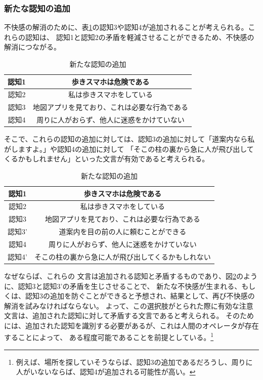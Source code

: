 \documentclass[11pt,a4j]{jreport}
\begin{document}
\subsubsection{新たな認知の追加}
不快感の解消のために、表\ref{fig: AvoidDissonance}の認知3や認知4が追加されることが考えられる。これらの認知は、
認知1と認知2の矛盾を軽減させることができるため、不快感の解消につながる。
\begin{table}[h]
  \centering
  \begin{tabular}{c|c}
      認知1 & 歩きスマホは危険である \\ \hline
      認知2 & 私は歩きスマホをしている \\ \hline
      認知3 & 地図アプリを見ており、これは必要な行為である \\\hline
      認知4 & 周りに人がおらず、他人に迷惑をかけていない \\ 
  \end{tabular}
  \caption{新たな認知の追加}
  \label{fig: AvoidDissonance}
\end{table}
そこで、これらの認知の追加に対しては、認知3の追加に対して「道案内なら私がしますよ。」や認知4の追加に対して
「そこの柱の裏から急に人が飛び出してくるかもしれません」といった文言が有効であると考えられる。
\begin{table}[h]
  \centering
  \begin{tabular}{c|c}
      認知1 & 歩きスマホは危険である \\ \hline
      認知2 & 私は歩きスマホをしている \\ \hline
      認知3 & 地図アプリを見ており、これは必要な行為である \\
      認知3' & 道案内を目の前の人に頼むことができる \\ \hline
      認知4 & 周りに人がおらず、他人に迷惑をかけていない \\ 
      認知4' & そこの柱の裏から急に人が飛び出してくるかもしれない \\ 
  \end{tabular}
  \caption{新たな認知の追加}
  \label{fig: AvoidDissonanceBlock}
\end{table}
なぜならば、これらの
文言は追加される認知と矛盾するものであり、図\ref{fig: AvoidDissonanceBlock}のように、認知3と認知3'の矛盾を生じさせることで、
新たな不快感が生まれる、もしくは、認知3の追加を防ぐことができると予想され、結果として、再び不快感の解消を試みなければならない。
よって、この選択肢がとられた際に有効な注意文言は、追加された認知に対して矛盾する文言であると考えられる。
そのためには、追加された認知を識別する必要があるが、これは人間のオペレータが存在することによって、
ある程度可能であることを前提としている。\footnote[1]{例えば、場所を探していそうならば、認知3の追加であるだろうし、周りに人がいないならば、認知4が追加される可能性が高い。}
\end{document}

